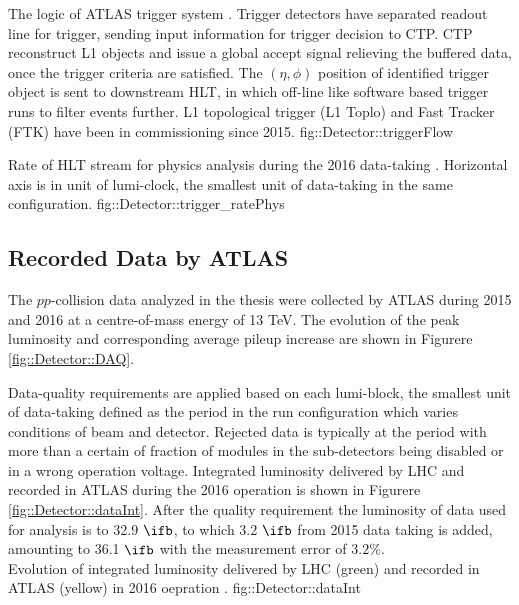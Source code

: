 %
{The logic of ATLAS trigger system \cite{ATLASTrigger2015}. Trigger detectors have separated readout line for trigger, sending input information for trigger decision to CTP. 
CTP reconstruct L1 objects and issue a global accept signal relieving the buffered data, once the trigger criteria are satisfied. 
The $(\eta,\phi)$ position of identified trigger object is sent to downstream HLT, in which off-line like software based trigger runs to filter events further.
L1 topological trigger (L1 Toplo) and Fast Tracker (FTK) have been in commissioning since 2015. 
}
{fig::Detector::triggerFlow}

{Rate of HLT stream for physics analysis during the 2016 data-taking \cite{trigPubResult}. Horizontal axis is in unit of lumi-clock, the smallest unit of data-taking in the same configuration.}
{fig::Detector::trigger_ratePhys}



\subsection{Recorded Data by ATLAS}
The $pp$-collision data analyzed in the thesis were collected by ATLAS during 2015 and 2016 at a centre-of-mass energy of 13 TeV. 
The evolution of the peak luminosity and  corresponding average pileup increase are shown in Figurere \ref{fig::Detector::DAQ}.

Data-quality requirements are applied based on each lumi-block, the smallest unit of data-taking defined as the period in the run configuration which varies conditions of beam and detector. 
Rejected data is typically at the period with more than a certain of fraction of modules in the sub-detectors being disabled or in a wrong operation voltage.
Integrated luminosity delivered by LHC and recorded in ATLAS during the 2016 operation is shown in Figurere \ref{fig::Detector::dataInt}. After the quality requirement the luminosity of data used for analysis is to 32.9 $\ifb$, to which 3.2 $\ifb$ from 2015 data taking is added, amounting to 36.1 $\ifb$ with the measurement error of $3.2\%$. \\

{Evolution of integrated luminosity delivered by LHC (green) and recorded in ATLAS (yellow) in 2016 oepration \cite{DAQ2016}.}
{fig::Detector::dataInt}

